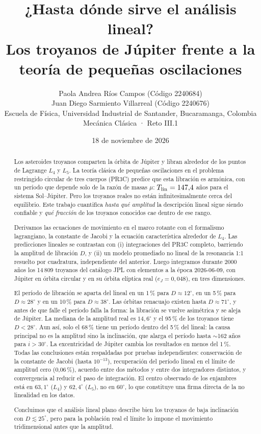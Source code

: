 \documentclass[11pt, a4paper]{article}
\title{\vspace{-1.2cm}¿Hasta dónde sirve el análisis lineal?\\[2pt] \large Los troyanos de Júpiter frente a la teoría de pequeñas oscilaciones}
\author{Paola Andrea Ríos Campos \quad (Código 2240684) \\ Juan Diego Sarmiento Villarreal \quad (Código 2240676)\\[2pt]
\small Escuela de Física, Universidad Industrial de Santander, Bucaramanga, Colombia\\ \small Mecánica Clásica · Reto III.1}
\date{18 de noviembre de 2026}
\newcommand{\Tlin}{T_{\rm lin}}
\begin{document}
\maketitle
\thispagestyle{plain}


\begin{abstract}
\noindent Los asteroides troyanos comparten la órbita de Júpiter y libran alrededor de los puntos de Lagrange $L_4$ y $L_5$. La teoría clásica de pequeñas oscilaciones en el problema restringido circular de tres cuerpos (PR3C) predice que esta libración es armónica, con un período que depende solo de la razón de masas $\mu$: $\Tlin = 147{,}4$ años para el sistema Sol--Júpiter. Pero los troyanos reales no están infinitesimalmente cerca del equilibrio. Este trabajo cuantifica \emph{hasta qué amplitud} la descripción lineal sigue siendo confiable y \emph{qué fracción} de los troyanos conocidos cae dentro de ese rango.

Derivamos las ecuaciones de movimiento en el marco rotante con el formalismo lagrangiano, la constante de Jacobi y la ecuación característica alrededor de $L_4$. Las predicciones lineales se contrastan con (i) integraciones del PR3C completo, barriendo la amplitud de libración $D$, y (ii) un modelo promediado no lineal de la resonancia 1:1 resuelto por cuadratura, independiente del anterior. Luego integramos durante 2000 años los 14\,809 troyanos del catálogo JPL con elementos a la época 2026-06-09, con Júpiter en órbita circular y en su órbita elíptica real ($e_J=0{,}048$), en tres dimensiones.

El período de libración se aparta del lineal en un 1\,\% para $D\approx 12^\circ$, en un 5\,\% para $D\approx 28^\circ$ y en un 10\,\% para $D\approx 38^\circ$. Las órbitas renacuajo existen hasta $D\approx 71^\circ$, y antes de que falle el período falla la forma: la libración se vuelve asimétrica y se aleja de Júpiter. La mediana de la amplitud real es $14{,}6^\circ$ y el 95\,\% de los troyanos tiene $D<28^\circ$. Aun así, solo el 68\,\% tiene un período dentro del 5\,\% del lineal: la causa principal no es la amplitud sino la inclinación, que alarga el período hasta $\sim$162 años para $i>30^\circ$. La excentricidad de Júpiter cambia los resultados en menos del 1\,\%. Todas las conclusiones están respaldadas por pruebas independientes: conservación de la constante de Jacobi (hasta $10^{-13}$), recuperación del período lineal en el límite de amplitud cero (0,06\,\%), acuerdo entre dos métodos y entre dos integradores distintos, y convergencia al reducir el paso de integración. El centro observado de los enjambres está en $63{,}1^\circ$ ($L_4$) y $62{,}4^\circ$ ($L_5$), no en $60^\circ$, lo que constituye una firma directa de la no linealidad en los datos.

Concluimos que el análisis lineal plano describe bien los troyanos de baja inclinación con $D\lesssim 25^\circ$, pero para la población real el límite lo impone el movimiento tridimensional antes que la amplitud.
\end{abstract}
\end{document}
